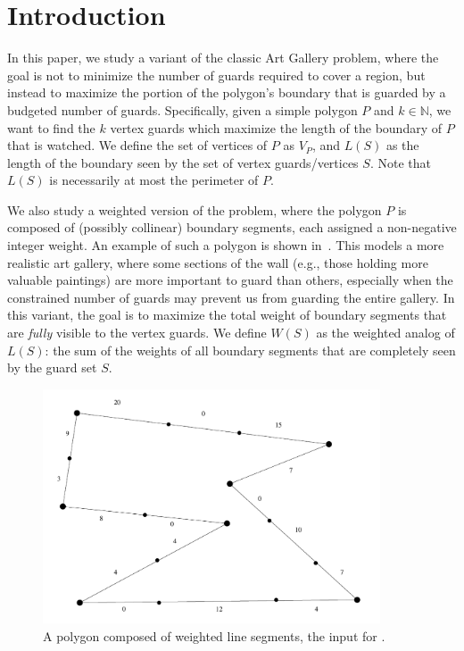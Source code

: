\section{Introduction}
In this paper, we study a variant of the classic Art Gallery problem, where the goal is not to minimize the number of guards required to cover a region, but instead to maximize the portion of the polygon's boundary that is guarded by a budgeted number of guards. Specifically, given a simple polygon $P$ and $k\in\mathbb{N}$, we want to find the $k$ vertex guards which maximize the length of the boundary of $P$ that is watched. We define the set of vertices of $P$ as $V_P$, and $L(S)$ as the length of the boundary seen by the set of vertex guards/vertices $S$. Note that $L(S)$ is necessarily at most the perimeter of $P$. 


We also study a weighted version of the problem, where the polygon $P$ is composed of (possibly collinear) boundary segments, each assigned a non-negative integer weight. An example of such a polygon is shown in~. This models a more realistic art gallery, where some sections of the wall (e.g., those holding more valuable paintings) are more important to guard than others, especially when the constrained number of guards may prevent us from guarding the entire gallery. In this variant, the goal is to maximize the total weight of boundary segments that are \emph{fully} visible to the vertex guards. We define $W(S)$ as the weighted analog of $L(S)$: the sum of the weights of all boundary segments that are completely seen by the guard set $S$.

\begin{figure}
    \centering
    \includegraphics[width=10cm]{figures/weighted-polygon.png}
    \caption{A polygon composed of weighted line segments, the input for \MVVG{}.}
    \label{fig:weighted-polygon}
\end{figure}

